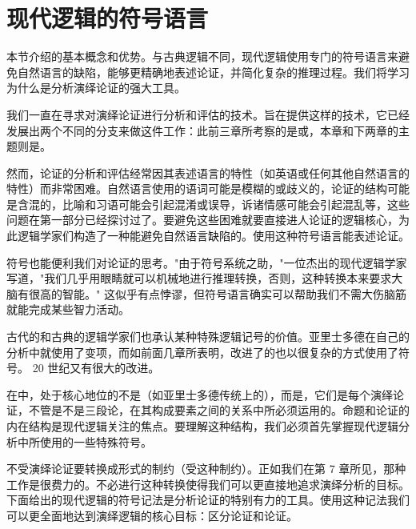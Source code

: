 \section{现代逻辑的符号语言}

\begin{logicbox}[title=引言]
本节介绍的基本概念和优势。与古典逻辑不同，现代逻辑使用专门的符号语言来避免自然语言的缺陷，能够更精确地表述论证，并简化复杂的推理过程。我们将学习为什么是分析演绎论证的强大工具。
\end{logicbox}

我们一直在寻求对演绎论证进行分析和评估的技术。旨在提供这样的技术，它已经发展出两个不同的分支来做这件工作：此前三章所考察的是或，本章和下两章的主题则是。

然而，论证的分析和评估经常因其表述语言的特性（如英语或任何其他自然语言的特性）而非常困难。自然语言使用的语词可能是模糊的或歧义的，论证的结构可能是含混的，比喻和习语可能会引起混淆或误导，诉诸情感可能会引起混乱等，这些问题在第一部分已经探讨过了。要避免这些困难就要直接进人论证的逻辑核心，为此逻辑学家们构造了一种能避免自然语言缺陷的。使用这种符号语言能表述论证。

\begin{examplebox}[title=符号语言的优势]
符号也能便利我们对论证的思考。"由于符号系统之助，"一位杰出的现代逻辑学家写道，"我们几乎用眼睛就可以机械地进行推理转换，否则，这种转换本来要求大脑有很高的智能。"\cite{quine1940} 这似乎有点悖谬，但符号语言确实可以帮助我们不需大伤脑筋就能完成某些智力活动。
\end{examplebox}

古代的和古典的逻辑学家们也承认某种特殊逻辑记号的价值。亚里士多德在自己的分析中就使用了变项，而如前面几章所表明，改进了的也以很复杂的方式使用了符号。\cite{aristotle-logic} 20 世纪又有很大的改进。

\begin{theorembox}[title=现代逻辑的核心特征]
在中，处于核心地位的不是（如亚里士多德传统上的），而是，它们是每个演绎论证，不管是不是三段论，在其构成要素之间的关系中所必须运用的。命题和论证的内在结构是现代逻辑关注的焦点。要理解这种结构，我们必须首先掌握现代逻辑分析中所使用的一些特殊符号。
\end{theorembox}

不受演绎论证要转换成形式的制约（受这种制约）。正如我们在第 7 章所见，那种工作是很费力的。不必进行这种转换使得我们可以更直接地追求演绎分析的目标。下面给出的现代逻辑的符号记法是分析论证的特别有力的工具。使用这种记法我们可以更全面地达到演绎逻辑的核心目标：区分论证和论证。

